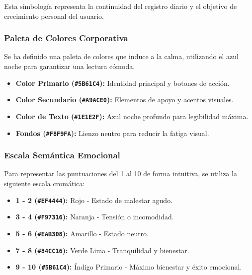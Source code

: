 Esta simbología representa la continuidad del registro diario y el objetivo de crecimiento personal del usuario.

\subsubsection{Paleta de Colores Corporativa}

Se ha definido una paleta de colores que induce a la calma, utilizando el azul noche para garantizar una lectura cómoda.

\begin{itemize}
    \item {} \textbf{Color Primario (\texttt{\#5B61C4}):} Identidad principal y botones de acción.
    \item {} \textbf{Color Secundario (\texttt{\#A9ACE0}):} Elementos de apoyo y acentos visuales.
    \item {} \textbf{Color de Texto (\texttt{\#1E1E2F}):} Azul noche profundo para legibilidad máxima.
    \item {} \textbf{Fondos (\texttt{\#F8F9FA}):} Lienzo neutro para reducir la fatiga visual.
\end{itemize}

\subsubsection{Escala Semántica Emocional}

Para representar las puntuaciones del 1 al 10 de forma intuitiva, se utiliza la siguiente escala cromática:

\begin{itemize}
    \item {} \textbf{1 - 2 (\texttt{\#EF4444}):} Rojo - Estado de malestar agudo.
    \item {} \textbf{3 - 4 (\texttt{\#F97316}):} Naranja - Tensión o incomodidad.
    \item {} \textbf{5 - 6 (\texttt{\#EAB308}):} Amarillo - Estado neutro.
    \item {} \textbf{7 - 8 (\texttt{\#84CC16}):} Verde Lima - Tranquilidad y bienestar.
    \item {} \textbf{9 - 10 (\texttt{\#5B61C4}):} Índigo Primario - Máximo bienestar y éxito emocional.
\end{itemize}

